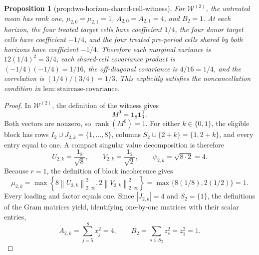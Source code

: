 \documentclass{article}
\newtheorem{proposition}{Proposition}
\begin{document}
\begin{proposition}[prop:two-horizon-shared-cell-witness]\label{prop:two-horizon-shared-cell-witness}
For \(\mathcal W^{(2)}\), the untreated mean has rank one, \(\mu_{2,0}=\mu_{2,1}=1\), \(A_{2,0}=A_{2,1}=4\), and \(B_2=1\). At each horizon, the four treated target cells have coefficient \(1/4\), the four donor target cells have coefficient \(-1/4\), and the four treated pre-period cells shared by both horizons have coefficient \(-1/4\). Therefore each marginal variance is \(12(1/4)^2=3/4\), each shared-cell covariance product is \((-1/4)(-1/4)=1/16\), the off-diagonal covariance is \(4/16=1/4\), and the correlation is \((1/4)/(3/4)=1/3\). This explicitly satisfies the noncancellation condition in \(\mathrm{lem:staircase\mbox{-}covariance}\).
\end{proposition}
\begin{proof}
In \(\mathcal W^{(2)}\), the definition of the witness gives
\[
 M^0=\mathbf 1_8\mathbf 1_3^{\top}.
\]
Both vectors are nonzero, so \(\operatorname{rank}(M^0)=1\).  For either
\(k\in\{0,1\}\), the eligible block has rows
\(I_2\cup J_{2,k}=\{1,\ldots,8\}\), columns
\(S_2\cup\{2+k\}=\{1,2+k\}\), and every entry equal to one.  A compact
singular value decomposition is therefore
\[
 U_{2,k}=\frac{\mathbf 1_8}{\sqrt 8},
 \qquad
 V_{2,k}=\frac{\mathbf 1_2}{\sqrt 2},
 \qquad
 \psi_{2,k}=\sqrt{8\cdot2}=4.
\]
Because \(r=1\), the definition of block incoherence gives
\[
 \mu_{2,k}
 =\max\!\left\{
 8\left\|U_{2,k}\right\|_{2,\infty}^2,
 2\left\|V_{2,k}\right\|_{2,\infty}^2
 \right\}
 =\max\{8(1/8),2(1/2)\}=1.
\]
Every loading and factor equals one.  Since \(|J_{2,k}|=4\) and
\(S_2=\{1\}\), the definitions of the Gram matrices yield, identifying
one-by-one matrices with their scalar entries,
\[
 A_{2,k}=\sum_{j=5}^{8}x_j^2=4,
 \qquad
 B_2=\sum_{s\in S_2}z_s^2=z_1^2=1.
\]


\end{proof}
\end{document}
